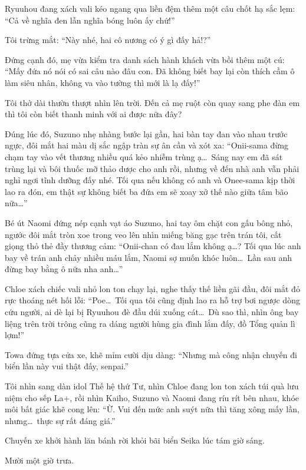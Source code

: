 \documentclass[../main.tex]{subfiles}
\begin{document}
Ryuuhou đang xách vali kéo ngang qua liền đệm thêm một câu chốt hạ sắc lẹm: ``Cả về nghĩa đen lẫn nghĩa bóng luôn ấy chứ!''

Tôi trừng mắt: ``Này nhé, hai cô nương có ý gì đấy hả!?''

Đứng cạnh đó, mẹ vừa kiểm tra danh sách hành khách vừa bồi thêm một cú: ``Mấy đứa nó nói có sai câu nào đâu con. Đã không biết bay lại còn thích cầm ô làm siêu nhân, không va vào tường thì mới là lạ đấy!''

Tôi thở dài thườn thượt nhìn lên trời. Đến cả mẹ ruột còn quay sang phe đàn em thì tôi còn biết thanh minh với ai được nữa đây?

Đúng lúc đó, Suzuno nhẹ nhàng bước lại gần, hai bàn tay đan vào nhau trước ngực, đôi mắt hai màu dị sắc ngập tràn sự ân cần và xót xa: ``Onii-sama đừng chạm tay vào vết thương nhiều quá kẻo nhiễm trùng ạ\dots\ Sáng nay em đã sát trùng lại và bôi thuốc mỡ thảo dược cho anh rồi, nhưng về đến nhà anh vẫn phải nghỉ ngơi tĩnh dưỡng đấy nhé. Tối qua nếu không có anh và Onee-sama kịp thời lao ra đón, em thật sự không biết ba đứa em sẽ xoay xở thế nào giữa tâm bão nữa\dots''

Bé út Naomi đứng nép cạnh vạt áo Suzuno, hai tay ôm chặt con gấu bông nhỏ, ngước đôi mắt tròn xoe trong veo lên nhìn miếng băng gạc trên trán tôi, cất giọng thỏ thẻ đầy thương cảm: ``Onii-chan có đau lắm không ạ\dots? Tối qua lúc anh bay về trán anh chảy nhiều máu lắm, Naomi sợ muốn khóc luôn\dots\ Lần sau anh đừng bay bằng ô nữa nha anh\dots''

Chloe xách chiếc vali nhỏ lon ton chạy lại, nghe thấy thế liền gãi đầu, đôi mắt đỏ rực thoáng nét hối lỗi: ``Poe\dots\ Tối qua tôi cũng định lao ra hỗ trợ bơi ngược dòng cứu người, ai dè lại bị Ryuuhou đè đầu dúi xuống cát\dots\ Dù sao thì, nhìn ông bay liệng trên trời trông cũng ra dáng người hùng gia đình lắm đấy, đồ Tổng quản lì lợm!''

Towa đứng tựa cửa xe, khẽ mỉm cười dịu dàng: ``Nhưng mà công nhận chuyến đi biển lần này vui thật đấy, senpai.''

Tôi nhìn sang dàn idol Thế hệ thứ Tư, nhìn Chloe đang lon ton xách túi quà lưu niệm cho sếp La+, rồi nhìn Kaiho, Suzuno và Naomi đang ríu rít bên nhau, khóe môi bất giác khẽ cong lên: ``Ừ. Vui đến mức anh suýt nữa thì tăng xông mấy lần, nhưng\dots\ thực sự rất đáng giá.''

Chuyến xe khởi hành lăn bánh rời khỏi bãi biển Seika lúc tám giờ sáng.

\ct

Mười một giờ trưa.
\end{document}
